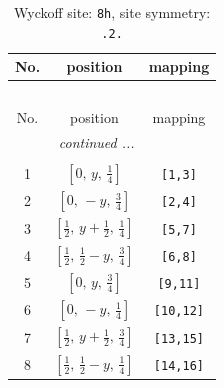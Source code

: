 \documentclass[fleqn,8pt]{jsarticle}
\begin{document}
\begin{longtable}{ccc}
\caption{Wyckoff site: {\tt 8h}, site symmetry: {\tt .2.}}
 \\
 \hline \hline
No. & position & mapping \\ \hline \endfirsthead

\multicolumn{2}{l}{\tablename\ \thetable{}} \\
 \hline \hline
No. & position & mapping \\ \hline \endhead

 \hline \hline
\multicolumn{2}{r}{\footnotesize\it continued ...} \\ \endfoot

 \hline \hline
\multicolumn{2}{r}{} \\ \endlastfoot

1 & $\left[ 0,\, y,\, \frac{1}{4} \right]$ & {\tt [1,3]} \\ \hline
2 & $\left[ 0,\, - y,\, \frac{3}{4} \right]$ & {\tt [2,4]} \\ \hline
3 & $\left[ \frac{1}{2},\, y + \frac{1}{2},\, \frac{1}{4} \right]$ & {\tt [5,7]} \\ \hline
4 & $\left[ \frac{1}{2},\, \frac{1}{2} - y,\, \frac{3}{4} \right]$ & {\tt [6,8]} \\ \hline
5 & $\left[ 0,\, y,\, \frac{3}{4} \right]$ & {\tt [9,11]} \\ \hline
6 & $\left[ 0,\, - y,\, \frac{1}{4} \right]$ & {\tt [10,12]} \\ \hline
7 & $\left[ \frac{1}{2},\, y + \frac{1}{2},\, \frac{3}{4} \right]$ & {\tt [13,15]} \\ \hline
8 & $\left[ \frac{1}{2},\, \frac{1}{2} - y,\, \frac{1}{4} \right]$ & {\tt [14,16]} \\
\end{longtable}
\renewcommand{\arraystretch}{1.2}
\end{document}

